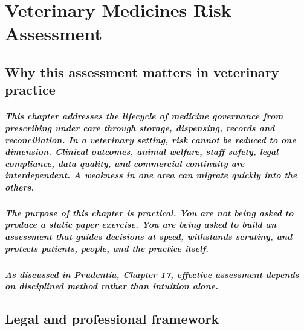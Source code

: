 \chapter{Veterinary Medicines Risk Assessment}
\label{chap:Veterinary Medicines Risk Assessment}

\section{Why this assessment matters in veterinary practice}

\paragraph{This chapter addresses the lifecycle of medicine governance from prescribing under care through storage, dispensing, records and reconciliation. In a veterinary setting, risk cannot be reduced to one dimension. Clinical outcomes, animal welfare, staff safety, legal compliance, data quality, and commercial continuity are interdependent. A weakness in one area can migrate quickly into the others.}

\paragraph{The purpose of this chapter is practical. You are not being asked to produce a static paper exercise. You are being asked to build an assessment that guides decisions at speed, withstands scrutiny, and protects patients, people, and the practice itself.}

\paragraph{As discussed in Prudentia, Chapter 17, effective assessment depends on disciplined method rather than intuition alone.}



\section{Legal and professional framework}

